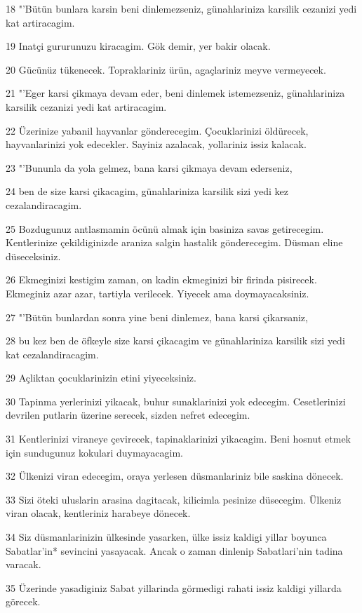 \par 18 "'Bütün bunlara karsin beni dinlemezseniz, günahlariniza karsilik cezanizi yedi kat artiracagim.
\par 19 Inatçi gururunuzu kiracagim. Gök demir, yer bakir olacak.
\par 20 Gücünüz tükenecek. Topraklariniz ürün, agaçlariniz meyve vermeyecek.
\par 21 "'Eger karsi çikmaya devam eder, beni dinlemek istemezseniz, günahlariniza karsilik cezanizi yedi kat artiracagim.
\par 22 Üzerinize yabanil hayvanlar gönderecegim. Çocuklarinizi öldürecek, hayvanlarinizi yok edecekler. Sayiniz azalacak, yollariniz issiz kalacak.
\par 23 "'Bununla da yola gelmez, bana karsi çikmaya devam ederseniz,
\par 24 ben de size karsi çikacagim, günahlariniza karsilik sizi yedi kez cezalandiracagim.
\par 25 Bozdugunuz antlasmamin öcünü almak için basiniza savas getirecegim. Kentlerinize çekildiginizde araniza salgin hastalik gönderecegim. Düsman eline düseceksiniz.
\par 26 Ekmeginizi kestigim zaman, on kadin ekmeginizi bir firinda pisirecek. Ekmeginiz azar azar, tartiyla verilecek. Yiyecek ama doymayacaksiniz.
\par 27 "'Bütün bunlardan sonra yine beni dinlemez, bana karsi çikarsaniz,
\par 28 bu kez ben de öfkeyle size karsi çikacagim ve günahlariniza karsilik sizi yedi kat cezalandiracagim.
\par 29 Açliktan çocuklarinizin etini yiyeceksiniz.
\par 30 Tapinma yerlerinizi yikacak, buhur sunaklarinizi yok edecegim. Cesetlerinizi devrilen putlarin üzerine serecek, sizden nefret edecegim.
\par 31 Kentlerinizi viraneye çevirecek, tapinaklarinizi yikacagim. Beni hosnut etmek için sundugunuz kokulari duymayacagim.
\par 32 Ülkenizi viran edecegim, oraya yerlesen düsmanlariniz bile saskina dönecek.
\par 33 Sizi öteki uluslarin arasina dagitacak, kilicimla pesinize düsecegim. Ülkeniz viran olacak, kentleriniz harabeye dönecek.
\par 34 Siz düsmanlarinizin ülkesinde yasarken, ülke issiz kaldigi yillar boyunca Sabatlar'in* sevincini yasayacak. Ancak o zaman dinlenip Sabatlari'nin tadina varacak.
\par 35 Üzerinde yasadiginiz Sabat yillarinda görmedigi rahati issiz kaldigi yillarda görecek.
